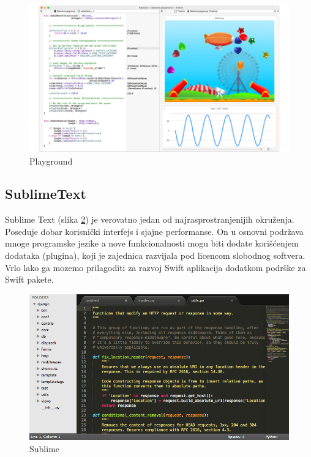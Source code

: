 \documentclass[a4paper]{article}
\begin{document}
\begin{figure}[h!]
\begin{center}
\includegraphics[scale=0.2]{playground.jpg}
\end{center}
\caption{Playground}
\label{fig:playground}
\end{figure}


\subsection{SublimeText}
\label{subsec:podnaslovSublimeText}

Sublime Text (slika \ref{fig:sublime}) je verovatno jedan od najrasprostranjenijih okruženja. Poseduje dobar korisnički interfejs i sjajne performanse. On u osnovni podržava mnoge programske jezike a nove funkcionalnosti mogu biti dodate korišćenjem dodataka (plugina), koji je zajednica razvijala pod licencom slobodnog softvera. Vrlo lako ga mozemo prilagoditi za razvoj Swift aplikacija dodatkom podrške za Swift pakete.

\begin{figure}[h!]
\begin{center}
\includegraphics[scale=0.25]{sublime.png}
\end{center}
\caption{Sublime}
\label{fig:sublime}
\end{figure}
\end{document}

